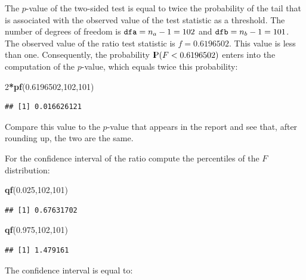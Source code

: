 \documentclass[]{krantz}
\makeatletter
\newenvironment{Shaded}{\begin{snugshade}}{\end{snugshade}}
\newcommand{\DecValTok}[1]{\textcolor[rgb]{0.00,0.00,0.81}{#1}}
\newcommand{\FloatTok}[1]{\textcolor[rgb]{0.00,0.00,0.81}{#1}}
\newcommand{\KeywordTok}[1]{\textcolor[rgb]{0.13,0.29,0.53}{\textbf{#1}}}
\newcommand{\NormalTok}[1]{#1}
\newcommand{\OperatorTok}[1]{\textcolor[rgb]{0.81,0.36,0.00}{\textbf{#1}}}
\newcommand{\Prob}{{\rm I\kern-.3em P}}
\newenvironment{kframe}{%
\medskip{}
\setlength{\fboxsep}{.8em}
 \def\at@end@of@kframe{}%
 \ifinner\ifhmode%
  \def\at@end@of@kframe{\end{minipage}}%
  \begin{minipage}{\columnwidth}%
 \fi\fi%
 \def\FrameCommand##1{\hskip\@totalleftmargin \hskip-\fboxsep
 \colorbox{shadecolor}{##1}\hskip-\fboxsep
     \hskip-\linewidth \hskip-\@totalleftmargin \hskip\columnwidth}%
 \MakeFramed {\advance\hsize-\width
   \@totalleftmargin\z@ \linewidth\hsize
   \@setminipage}}%
 {\par\unskip\endMakeFramed%
 \at@end@of@kframe}
\renewenvironment{Shaded}{\begin{kframe}}{\end{kframe}}
\theoremstyle{definition}
\theoremstyle{definition}
\theoremstyle{definition}
\theoremstyle{remark}
\makeatother
\begin{document}
The \(p\)-value of the two-sided test is equal to twice the probability of
the tail that is associated with the observed value of the test
statistic as a threshold. The number of degrees of freedom is
\(\mbox{\texttt{dfa}} = n_a - 1 = 102\) and
\(\mbox{\texttt{dfb}} = n_b - 1 = 101\). The observed value of the ratio
test statistic is \(f = 0.6196502\). This value is less than one.
Consequently, the probability \(\Prob(F < 0.6196502)\) enters into the
computation of the \(p\)-value, which equals twice this probability:

\begin{Shaded}
\begin{Highlighting}[]
\DecValTok{2}\OperatorTok{*}\KeywordTok{pf}\NormalTok{(}\FloatTok{0.6196502}\NormalTok{,}\DecValTok{102}\NormalTok{,}\DecValTok{101}\NormalTok{)}
\end{Highlighting}
\end{Shaded}

\begin{verbatim}
## [1] 0.016626121
\end{verbatim}

Compare this value to the \(p\)-value that appears in the report and see
that, after rounding up, the two are the same.

For the confidence interval of the ratio compute the percentiles of the
\(F\) distribution:

\begin{Shaded}
\begin{Highlighting}[]
\KeywordTok{qf}\NormalTok{(}\FloatTok{0.025}\NormalTok{,}\DecValTok{102}\NormalTok{,}\DecValTok{101}\NormalTok{)}
\end{Highlighting}
\end{Shaded}

\begin{verbatim}
## [1] 0.67631702
\end{verbatim}

\begin{Shaded}
\begin{Highlighting}[]
\KeywordTok{qf}\NormalTok{(}\FloatTok{0.975}\NormalTok{,}\DecValTok{102}\NormalTok{,}\DecValTok{101}\NormalTok{)}
\end{Highlighting}
\end{Shaded}

\begin{verbatim}
## [1] 1.479161
\end{verbatim}

The confidence interval is equal to:
\end{document}
